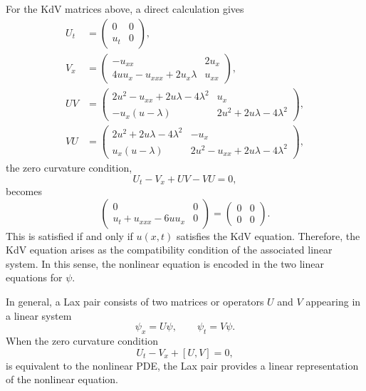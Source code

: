\documentclass[english,master]{liumaiex}
\theoremstyle{thesisplain}
\theoremstyle{thesisdefinition}
\numberwithin{equation}{section}
\begin{document}
For the KdV matrices above, a direct calculation gives
\begin{align}
U_t &=
\begin{pmatrix}
	0 & 0 \\
	u_t & 0
\end{pmatrix},\\
V_x &=
\begin{pmatrix}
	-u_{xx} & 2u_x \\
	4uu_x - u_{xxx} + 2u_x\lambda & u_{xx}
\end{pmatrix},\\
U V &=
\begin{pmatrix}
	2u^2 - u_{xx} + 2u\lambda - 4\lambda^2 & u_x \\
	-u_x(u - \lambda) & 2u^2 + 2u\lambda - 4\lambda^2
\end{pmatrix},\\
V U &=
\begin{pmatrix}
	2u^2 + 2u\lambda - 4\lambda^2 & -u_x \\
	u_x(u - \lambda) & 2u^2 - u_{xx} + 2u\lambda - 4\lambda^2
\end{pmatrix},
\end{align}
the zero curvature condition,
\begin{equation}
	U_t - V_x + U V - V U = 0,
\end{equation}
becomes
\begin{equation}
	\begin{pmatrix}
	0 & 0\\
	u_t + u_{xxx} - 6u u_x & 0
	\end{pmatrix} =
	\begin{pmatrix} 0 & 0 \\ 0 & 0 \end{pmatrix}.
\end{equation}
This is satisfied if and only if $u(x,t)$ satisfies the KdV equation. Therefore, the KdV equation arises as the compatibility condition of the associated linear system. In this sense, the nonlinear equation is encoded in the two linear equations for $\psi$.

In general, a Lax pair consists of two matrices or operators $U$ and $V$ appearing in a linear system
\begin{equation}
	\psi_x = U\psi,
	\qquad
	\psi_t = V\psi.
\end{equation}
When the zero curvature condition
\begin{equation}
	U_t - V_x + [U,V] = 0,
\end{equation}
is equivalent to the nonlinear PDE, the Lax pair provides a linear representation of the nonlinear equation.
\end{document}
